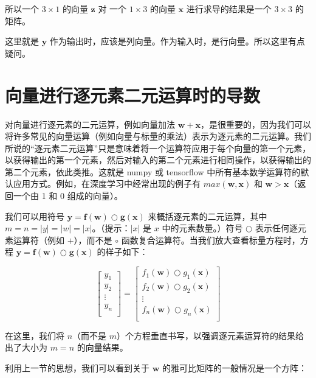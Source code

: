 \documentclass[lang=cn,newtx,10pt,scheme=chinese]{elegantbook}
\begin{document}
所以一个 $3 \times 1$ 的向量 $\mathbf{z}$ 对 一个 $1 \times 3$ 的向量 $\mathbf{x}$ 进行求导的结果是一个 $3 \times 3$ 的矩阵。

这里就是 $\mathbf{y}$ 作为输出时，应该是列向量。作为输入时，是行向量。所以这里有点疑问。

\section{向量进行逐元素二元运算时的导数}

对向量进行逐元素的二元运算，例如向量加法 $\mathbf{w} + \mathbf{x}$，是很重要的，因为我们可以将许多常见的向量运算（例如向量与标量的乘法）表示为逐元素的二元运算。我们所说的“逐元素二元运算”只是意味着将一个运算符应用于每个向量的第一个元素，以获得输出的第一个元素，然后对输入的第二个元素进行相同操作，以获得输出的第二个元素，依此类推。这就是 numpy 或 tensorflow 中所有基本数学运算符的默认应用方式。例如，在深度学习中经常出现的例子有 $max(\mathbf{w},\mathbf{x})$ 和 $\mathbf{w} > \mathbf{x}$（返回一个由 1 和 0 组成的向量）。

我们可以用符号 $\mathbf{y} = \mathbf{f(w)} \bigcirc \mathbf{g(x)}$ 来概括逐元素的二元运算，其中 $m=n=|y|=|w|=|x|$。（提示：$|x|$ 是 $x$ 中的元素数量。）符号 $\bigcirc$ 表示任何逐元素运算符（例如 $+$），而不是 $\circ$ 函数复合运算符。当我们放大查看标量方程时，方程 $\mathbf{y} = \mathbf{f(w)} \bigcirc \mathbf{g(x)}$ 的样子如下：

\[\begin{bmatrix}
           y_1\\
           y_2\\
           \vdots \\
           y_n\\
           \end{bmatrix} = \begin{bmatrix}
           f_{1}(\mathbf{w}) \bigcirc g_{1}(\mathbf{x})\\
           f_{2}(\mathbf{w}) \bigcirc g_{2}(\mathbf{x})\\
           \vdots \\
           f_{n}(\mathbf{w}) \bigcirc g_{n}(\mathbf{x})\\
         \end{bmatrix}\]

在这里，我们将 $n$（而不是 $m$）个方程垂直书写，以强调逐元素运算符的结果给出了大小为 $m=n$ 的向量结果。

利用上一节的思想，我们可以看到关于 $\mathbf{w}$ 的雅可比矩阵的一般情况是一个方阵：
\end{document}
